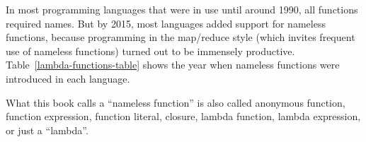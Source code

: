 In most programming languages that were in use until around 1990,
all functions required names. But by 2015, most languages added support
for nameless functions, because programming in the map/reduce style
(which invites frequent use of nameless functions) turned out to be
immensely productive. Table\ \ref{lambda-functions-table} shows
the year when nameless functions were introduced in each language.

What this book calls a \textsf{``}nameless function\textsf{''} is also called anonymous
function, function expression, function literal, closure, lambda
function, lambda expression, or just a \textsf{``}lambda\textsf{''}.
